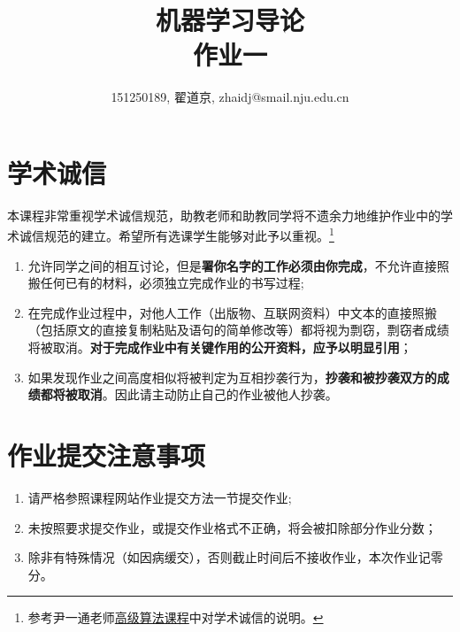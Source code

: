 \documentclass[a4paper,UTF8]{article}
\numberwithin{equation}{section}
\begin{document}
\title{机器学习导论\\
作业一}
\author{151250189, 翟道京, zhaidj@smail.nju.edu.cn}
\maketitle

\section*{学术诚信}

本课程非常重视学术诚信规范，助教老师和助教同学将不遗余力地维护作业中的学术诚信规范的建立。希望所有选课学生能够对此予以重视。\footnote{参考尹一通老师\href{http://tcs.nju.edu.cn/wiki/}{高级算法课程}中对学术诚信的说明。}

\begin{tcolorbox}
\begin{enumerate}
  \item[(1)] 允许同学之间的相互讨论，但是{\color{red}\textbf{署你名字的工作必须由你完成}}，不允许直接照搬任何已有的材料，必须独立完成作业的书写过程;
  \item[(2)] 在完成作业过程中，对他人工作（出版物、互联网资料）中文本的直接照搬（包括原文的直接复制粘贴及语句的简单修改等）都将视为剽窃，剽窃者成绩将被取消。{\color{red}\textbf{对于完成作业中有关键作用的公开资料，应予以明显引用}}；
  \item[(3)] 如果发现作业之间高度相似将被判定为互相抄袭行为，{\color{red}\textbf{抄袭和被抄袭双方的成绩都将被取消}}。因此请主动防止自己的作业被他人抄袭。
\end{enumerate}
\end{tcolorbox}

\section*{作业提交注意事项}
\begin{tcolorbox}
\begin{enumerate}
  \item[(1)] 请严格参照课程网站作业提交方法一节提交作业;
  \item[(2)] 未按照要求提交作业，或提交作业格式不正确，将会被扣除部分作业分数；
  \item[(3)] 除非有特殊情况（如因病缓交），否则截止时间后不接收作业，本次作业记零分。
\end{enumerate}
\end{tcolorbox}

\newpage
\end{document}
